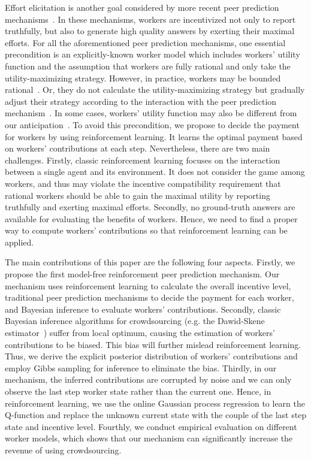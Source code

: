 \documentclass{article}
\begin{document}
Effort elicitation is another goal considered by more recent peer prediction mechanisms~\cite{witkowski2013dwelling,dasgupta2013crowdsourced,shnayder2016informed,liu2017sequential}.
In these mechanisms, workers are incentivized not only to report truthfully, but also to generate high quality answers by exerting their maximal efforts.
For all the aforementioned peer prediction mechanisms, one essential precondition is an explicitly-known worker model which includes workers' utility function and the assumption that workers are fully rational and only take the utility-maximizing strategy.
However, in practice, workers may be bounded rational~\cite{mckelvey1995quantal,jurca2007robust}.
Or, they do not calculate the utility-maximizing strategy but gradually adjust their strategy according to the interaction with the peer prediction mechanism~\cite{chastain2014algorithms,stojic2015human}.
In some cases, workers' utility function may also be different from our anticipation~\cite{bergemann2013introduction}.
To avoid this precondition, we propose to decide the payment for workers by using reinforcement learning.
It learns the optimal payment based on workers' contributions at each step.
Nevertheless, there are two main challenges.
Firstly, classic reinforcement learning focuses on the interaction between a single agent and its environment.
It does not consider the game among workers, and thus may violate the incentive compatibility requirement that rational workers should be able to gain the maximal utility by reporting truthfully and exerting maximal efforts.
Secondly, no ground-truth answers are available for evaluating the benefits of workers.
Hence, we need to find a proper way to compute workers' contributions so that reinforcement learning can be applied.

The main contributions of this paper are the following four aspects.
Firstly, we propose the first model-free reinforcement peer prediction mechanism.
Our mechanism uses reinforcement learning to calculate the overall incentive level, traditional peer prediction mechanisms to decide the payment for each worker, and Bayesian inference to evaluate workers' contributions.
Secondly, classic Bayesian inference algorithms for crowdsourcing (e.g. the Dawid-Skene estimator~\cite{dawid1979maximum}) suffer from local optimum, causing the estimation of workers' contributions to be biased.
This bias will further mislead reinforcement learning.
Thus, we derive the explicit posterior distribution of workers' contributions and employ Gibbs sampling for inference to eliminate the bias.
Thirdly, in our mechanism, the inferred contributions are corrupted by noise and we can only observe the last step worker state rather than the current one.
Hence, in reinforcement learning, we use the online Gaussian process regression to learn the Q-function and replace the unknown current state with the couple of the last step state and incentive level.
Fourthly, we conduct empirical evaluation on different worker models, which shows that our mechanism can significantly increase the revenue of using crowdsourcing.
\end{document}
